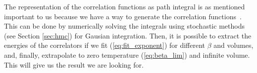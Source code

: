 The representation of the correlation functions as path integral is as mentioned important to us because we have a way to generate the correlation functions~\cite{graphhmc}. This can be done by numerically solving the integrals using stochastic methods (see Section \ref{sec:hmc}) for Gausian integration. Then, it is possible to extract the energies of the correlators if we fit (\ref{eq:fit_exponent}) for different $\beta$ and volumes, and, finally, extrapolate to zero temperature (\ref{eq:beta_lim}) and infinite volume. This will give us the result we are looking for.


